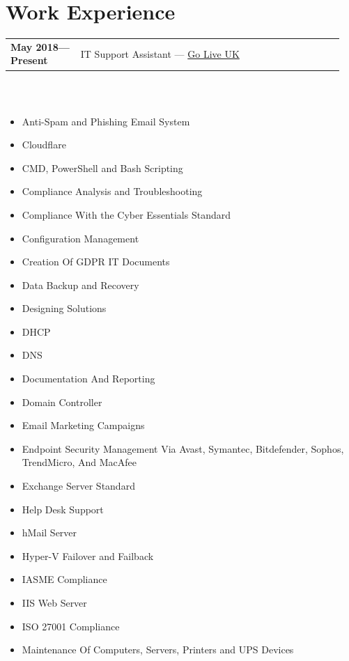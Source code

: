 \documentclass[letterpaper,10pt]{article}
\begin{document}
	\newpage
			
		\section*{Work Experience}
		\begin{tabular}{@{}p{0.2\linewidth} p{0.75\linewidth}}
			\textbf{May 2018—Present} & IT Support Assistant — \href{https://www.goliveuk.com/}{Go Live UK} \\
		\end{tabular}
		\\
		\begin{center}
			\begin{minipage}[t]{0.5\textwidth}
				\section*{}
				\begin{itemize}
\item Anti-Spam and Phishing Email System
\item Cloudflare
\item CMD, PowerShell and Bash Scripting
\item Compliance Analysis and Troubleshooting
\item Compliance With the Cyber Essentials Standard
\item Configuration Management
\item Creation Of GDPR IT Documents
\item Data Backup and Recovery
\item Designing Solutions
\item DHCP
\item DNS
\item Documentation And Reporting
\item Domain Controller
\item Email Marketing Campaigns
\item Endpoint Security Management Via Avast, Symantec, Bitdefender, Sophos, TrendMicro, And MacAfee
\item Exchange Server Standard
\item Help Desk Support
\item hMail Server
\item Hyper-V Failover and Failback
\item IASME Compliance
\item IIS Web Server
\item ISO 27001 Compliance
\item Maintenance Of Computers, Servers, Printers and UPS Devices
				\end{itemize}
			\end{minipage}%
			\begin{minipage}[t]{0.5\textwidth}

\end{minipage}
\end{center}
\end{document}
